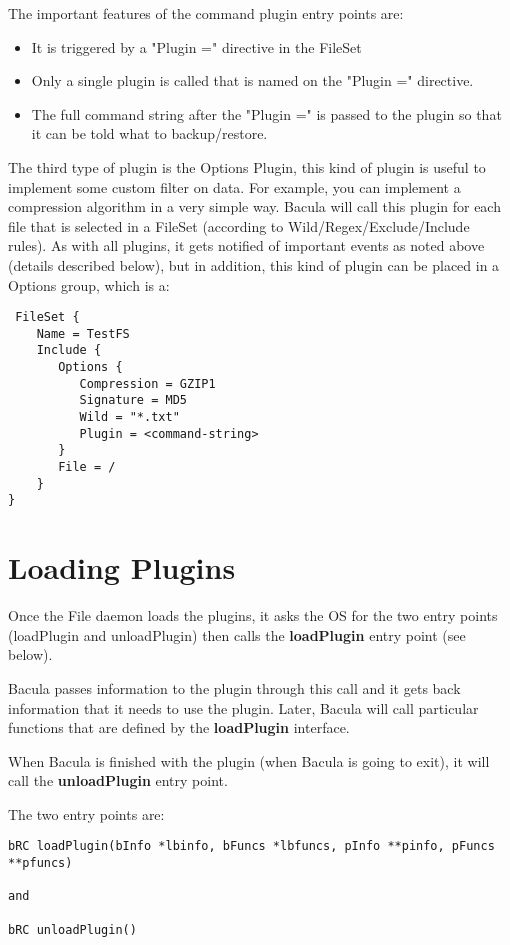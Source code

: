The important features of the command plugin entry points are:
\begin{itemize}
 \item It is triggered by a "Plugin =" directive in the FileSet
 \item Only a single plugin is called that is named on the "Plugin =" directive.
 \item The full command string after the "Plugin =" is passed to the plugin
    so that it can be told what to backup/restore.
\end{itemize}

The third type of plugin is the Options Plugin, this kind of plugin is useful
to implement some custom filter on data. For example, you can implement a
compression algorithm in a very simple way. Bacula will call this plugin for
each file that is selected in a FileSet (according to
Wild/Regex/Exclude/Include rules). As with all plugins, it gets notified of
important events as noted above (details described below), but in addition,
this kind of plugin can be placed in a Options group, which is a:

\begin{verbatim}
 FileSet {
    Name = TestFS
    Include {
       Options {
          Compression = GZIP1
          Signature = MD5
          Wild = "*.txt"
          Plugin = <command-string>
       }
       File = /
    }
}
\end{verbatim}

\section{Loading Plugins}
Once the File daemon loads the plugins, it asks the OS for the
two entry points (loadPlugin and unloadPlugin) then calls the
{\bf loadPlugin} entry point (see below).

Bacula passes information to the plugin through this call and it gets
back information that it needs to use the plugin.  Later, Bacula
 will call particular functions that are defined by the
{\bf loadPlugin} interface.

When Bacula is finished with the plugin
(when Bacula is going to exit), it will call the {\bf unloadPlugin}
entry point.

The two entry points are:

\begin{verbatim}
bRC loadPlugin(bInfo *lbinfo, bFuncs *lbfuncs, pInfo **pinfo, pFuncs **pfuncs)

and

bRC unloadPlugin()
\end{verbatim}


